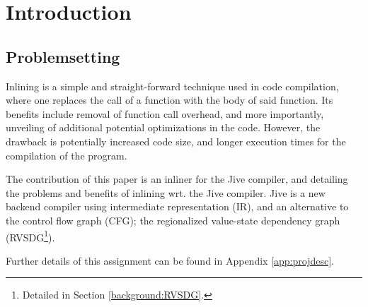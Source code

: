 
\section{Introduction}

\subsection{Problemsetting}


Inlining is a simple and straight-forward technique used in code compilation,
where one replaces the call of a function with the body of said function. Its
benefits include removal of function call overhead, and more importantly,
unveiling of additional potential optimizations in the code. However, the
drawback is potentially increased code size, and longer execution times for the
compilation of the program.

The contribution of this paper is an inliner for the Jive compiler, and
detailing the problems and benefits of inlining wrt. the Jive  compiler. Jive is a new backend compiler using intermediate
representation (IR), and an alternative to the control flow graph (CFG); the
regionalized value-state dependency graph (RVSDG\footnote{Detailed in Section
\ref{background:RVSDG}.}).


Further details of this assignment can be found in Appendix
\ref{app:projdesc}.
